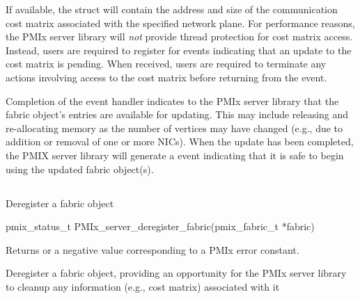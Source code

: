If available, the  struct will contain the address and size of the communication cost matrix associated with the specified network plane. For performance reasons, the \ac{PMIx} server library will \emph{not} provide thread protection for cost matrix access. Instead, users are required to register for  events indicating that an update to the cost matrix is pending. When received, users are required to terminate any actions involving access to the cost matrix before returning from the event.

Completion of the  event handler indicates to the \ac{PMIx} server library that the fabric object's entries are available for updating. This may include releasing and re-allocating memory as the number of vertices may have changed (e.g., due to addition or removal of one or more \acp{NIC}). When the update has been completed, the \ac{PMIX} server library will generate a  event indicating that it is safe to begin using the updated fabric object(s).

\subsection{}

\summary

Deregister a fabric object

\format

\cspecificstart
\begin{codepar}
pmix_status_t PMIx_server_deregister_fabric(pmix_fabric_t *fabric)
\end{codepar}
\cspecificend

\begin{arglist}
\end{arglist}

Returns  or a negative value corresponding to a \ac{PMIx} error constant.

\descr

Deregister a fabric object, providing an opportunity for the \ac{PMIx} server library to cleanup any information (e.g., cost matrix) associated with it


\subsection{}

